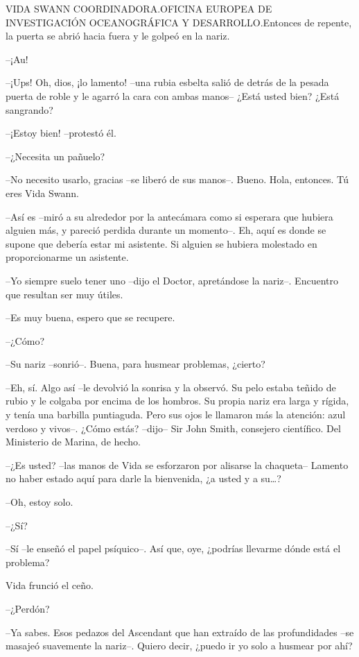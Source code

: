 {VIDA SWANN COORDINADORA.\@ OFICINA EUROPEA DE INVESTIGACIÓN
 OCEANOGRÁFICA Y DESARROLLO.\@ Entonces de repente, la puerta se abrió
hacia fuera y le golpeó en la nariz.}

{--¡Au!}

{--¡Ups! Oh, dios, ¡lo lamento! --una rubia esbelta salió de detrás de
 la pesada puerta de roble y le agarró la cara con ambas manos-- ¿Está
usted bien? ¿Está sangrando?}

{--¡Estoy bien! --protestó él.}

{--¿Necesita un pañuelo?}

{--No necesito usarlo, gracias --se liberó de sus manos--. Bueno. Hola,
entonces. Tú eres Vida Swann.}

{--Así es --miró a su alrededor por la antecámara como si esperara que
 hubiera alguien más, y pareció perdida durante un momento--. Eh, aquí es
 donde se supone que debería estar mi asistente. Si alguien se hubiera
molestado en proporcionarme un asistente.}

{--Yo siempre suelo tener uno --dijo el Doctor, apretándose la nariz--.
Encuentro que resultan ser muy útiles.}

{--Es muy buena, espero que se recupere.}

{--¿Cómo?}

{--Su nariz --sonrió--. Buena, para husmear problemas, ¿cierto?}

{--Eh, sí. Algo así --le devolvió la sonrisa y la observó. Su pelo
 estaba teñido de rubio y le colgaba por encima de los hombros. Su propia
 nariz era larga y rígida, y tenía una barbilla puntiaguda. Pero sus ojos
 le llamaron más la atención: azul verdoso y vivos--. ¿Cómo estás?
 --dijo-- Sir John Smith, consejero científico. Del Ministerio de Marina,
de hecho.}

{--¿Es usted? --las manos de Vida se esforzaron por alisarse la
 chaqueta-- Lamento no haber estado aquí para darle la bienvenida, ¿a
 usted y a su\ldots{}?}

{--Oh, estoy solo.}

{--¿Sí?}

{--Sí --le enseñó el papel psíquico--. Así que, oye, ¿podrías llevarme
dónde está el problema?}

{Vida frunció el ceño.}

{--¿Perdón?}

{--Ya sabes. Esos pedazos del Ascendant que han extraído de las
 profundidades --se masajeó suavemente la nariz--. Quiero decir, ¿puedo
ir yo solo a husmear por ahí?}

